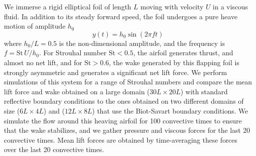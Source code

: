 \documentclass[11pt]{article}
\begin{document}
We immerse a rigid elliptical foil of length $L$ moving with velocity $U$ in a viscous fluid. In addition to its steady forward speed, the foil undergoes a pure heave motion of amplitude $h_0$
\begin{equation}
    y(t) = h_0 \sin(2\pi f t)
\end{equation}
where $h_0/L=0.5$ is the non-dimensional amplitude, and the frequency is $f = \text{St}\,U/h_0$. For Strouhal number $\text{St}<0.5$, the airfoil generates thrust, and almost no net lift, and for $\text{St}>0.6$, the wake generated by this flapping foil is strongly asymmetric and generates a significant net lift force. We perform simulations of this system for a range of Strouhal numbers and compare the mean lift force and wake obtained on a large domain ($30L\times20L$) with standard reflective boundary conditions to the ones obtained on two different domains of size ($6L\times4L$) and ($12L\times8L$) that use the Biot-Savart boundary conditions. We simulate the flow around this heaving airfoil for 100 convective times to ensure that the wake stabilizes, and we gather pressure and viscous forces for the last 20 convective times. Mean lift forces are obtained by time-averaging these forces over the last 20 convective times.
\end{document}
